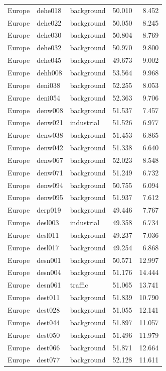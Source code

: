 \documentclass{article}
\begin{document}
\begin{longtable}{lllrr}
Europe & dehe018 & background & 50.010 & 8.452 \\ 
Europe & dehe022 & background & 50.050 & 8.245 \\ 
Europe & dehe030 & background & 50.804 & 8.769 \\ 
Europe & dehe032 & background & 50.970 & 9.800 \\ 
Europe & dehe045 & background & 49.673 & 9.002 \\ 
Europe & dehh008 & background & 53.564 & 9.968 \\ 
Europe & deni038 & background & 52.255 & 8.053 \\ 
Europe & deni054 & background & 52.363 & 9.706 \\ 
Europe & denw008 & background & 51.537 & 7.457 \\ 
Europe & denw021 & industrial & 51.526 & 6.977 \\ 
Europe & denw038 & background & 51.453 & 6.865 \\ 
Europe & denw042 & background & 51.338 & 6.640 \\ 
Europe & denw067 & background & 52.023 & 8.548 \\ 
Europe & denw071 & background & 51.249 & 6.732 \\ 
Europe & denw094 & background & 50.755 & 6.094 \\ 
Europe & denw095 & background & 51.937 & 7.612 \\ 
Europe & derp019 & background & 49.446 & 7.767 \\ 
Europe & desl003 & industrial & 49.358 & 6.734 \\ 
Europe & desl011 & background & 49.237 & 7.036 \\ 
Europe & desl017 & background & 49.254 & 6.868 \\ 
Europe & desn001 & background & 50.571 & 12.997 \\ 
Europe & desn004 & background & 51.176 & 14.444 \\ 
Europe & desn061 & traffic & 51.065 & 13.741 \\ 
Europe & dest011 & background & 51.839 & 10.790 \\ 
Europe & dest028 & background & 51.055 & 12.141 \\ 
Europe & dest044 & background & 51.897 & 11.057 \\ 
Europe & dest050 & background & 51.496 & 11.979 \\ 
Europe & dest066 & background & 51.871 & 12.664 \\ 
Europe & dest077 & background & 52.128 & 11.611 \\ 

\end{longtable}
\end{document}
